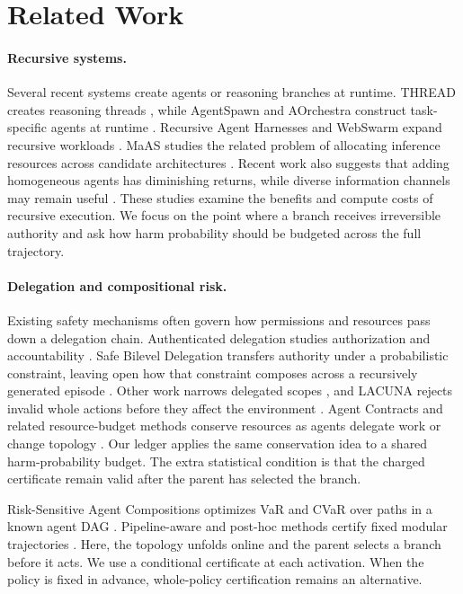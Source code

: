 \documentclass[sigconf,nonacm]{acmart}
\begin{document}
\section{Related Work}

\paragraph{Recursive systems.}
Several recent systems create agents or reasoning branches at runtime.  THREAD creates reasoning
threads \cite{schroeder2025thread}, while AgentSpawn and AOrchestra construct task-specific agents at
runtime \cite{costa2026agentspawn,ruan2026aorchestra}.  Recursive Agent Harnesses and WebSwarm
expand recursive workloads \cite{lumer2026rah,song2026webswarm}.  MaAS studies the related
problem of allocating inference resources across candidate architectures
\cite{zhang2025maas}.  Recent work also suggests that adding homogeneous agents has diminishing
returns, while diverse information channels may remain useful \cite{yang2026diversity}.  These
studies examine the benefits and compute costs of recursive execution.  We focus on the point
where a branch receives irreversible authority and ask how harm probability
should be budgeted across the full trajectory.

\paragraph{Delegation and compositional risk.}
Existing safety mechanisms often govern how permissions and resources pass down a delegation
chain.  Authenticated delegation studies authorization and accountability
\cite{south2025delegation}.  Safe Bilevel Delegation transfers authority under a probabilistic
constraint, leaving open how that constraint composes across a recursively generated episode
\cite{sun2026sbd}.  Other work narrows delegated scopes
\cite{muruaga2026bounded,ibrahim2026overlay}, and LACUNA rejects invalid whole actions before
they affect the environment \cite{zhao2026lacuna}.  Agent Contracts and related resource-budget
methods conserve resources as agents delegate work or change topology
\cite{ye2026contracts,talluri2026rgao,khan2026token}.  Our ledger applies the same conservation
idea to a shared harm-probability budget.  The extra statistical condition is that the charged
certificate remain valid after the parent has selected the branch.

Risk-Sensitive Agent Compositions optimizes VaR and CVaR over paths in a known agent DAG
\cite{shabadi2026risk}.  Pipeline-aware and post-hoc methods certify fixed modular trajectories
\cite{kotte2026pasc,li2026trajectory}.  Here, the topology unfolds online and the parent selects a
branch before it acts.  We use a conditional certificate at each activation.  When the policy is
fixed in advance, whole-policy certification remains an alternative.
\end{document}
